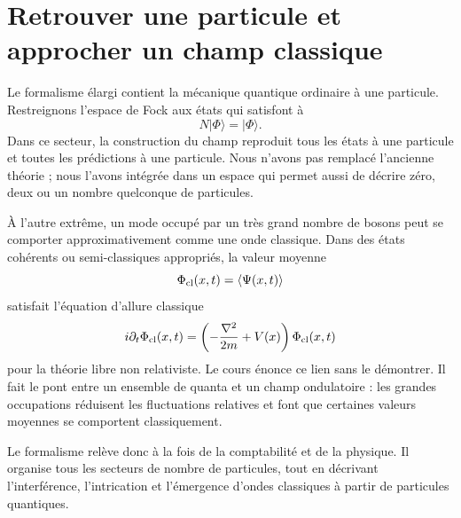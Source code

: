 \section{Retrouver une particule et approcher un champ classique}

Le formalisme élargi contient la mécanique quantique ordinaire à une particule. Restreignons l’espace de Fock aux états qui satisfont à
\begin{equation}
N|\Phi\rangle=|\Phi\rangle.
\end{equation}
Dans ce secteur, la construction du champ reproduit tous les états à une particule et toutes les prédictions à une particule. Nous n’avons pas remplacé l’ancienne théorie ; nous l’avons intégrée dans un espace qui permet aussi de décrire zéro, deux ou un nombre quelconque de particules.

À l’autre extrême, un mode occupé par un très grand nombre de bosons peut se comporter approximativement comme une onde classique. Dans des états cohérents ou semi-classiques appropriés, la valeur moyenne
\begin{equation}
\Phi_{\rm cl}(x,t)=\langle\Psi(x,t)\rangle
\end{equation}
satisfait l’équation d’allure classique
\begin{equation}
i\partial_t\Phi_{\rm cl}(x,t)
=\left(-\frac{\nabla^2}{2m}+V(x)\right)\Phi_{\rm cl}(x,t)
\label{eq:l07-classical-schrodinger}
\end{equation}
pour la théorie libre non relativiste. Le cours énonce ce lien sans le démontrer. Il fait le pont entre un ensemble de quanta et un champ ondulatoire : les grandes occupations réduisent les fluctuations relatives et font que certaines valeurs moyennes se comportent classiquement.

Le formalisme relève donc à la fois de la comptabilité et de la physique. Il organise tous les secteurs de nombre de particules, tout en décrivant l’interférence, l’intrication et l’émergence d’ondes classiques à partir de particules quantiques.

\begin{classroomqa}
\end{classroomqa}

